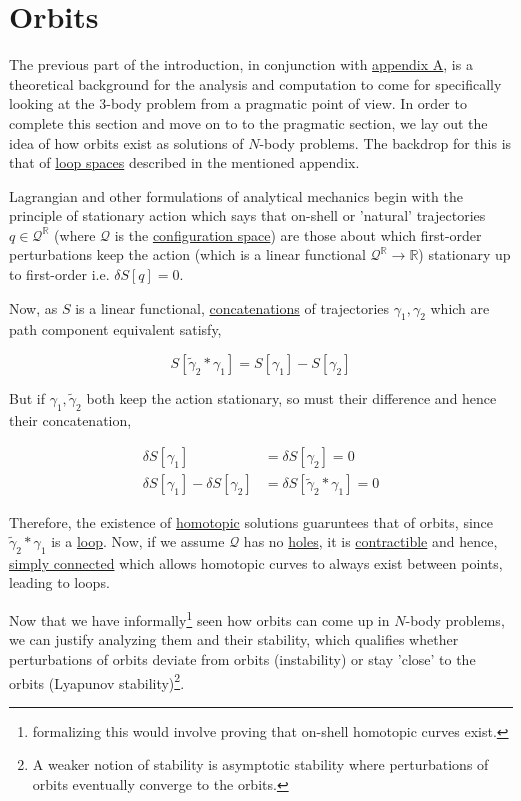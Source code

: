 \documentclass[oneside]{book}
\begin{document}
\newpage
\section{Orbits}

The previous part of the introduction, in conjunction with \hyperref[appendix_A]{appendix A}, is a theoretical background for the analysis and computation to come for specifically looking at the 3-body problem from a pragmatic point of view. In order to complete this section and move on to to the pragmatic section, we lay out the idea of how orbits exist as solutions of $N$-body problems. The backdrop for this is that of \hyperref[loop_spaces]{loop spaces} described in the mentioned appendix.

Lagrangian and other formulations of analytical mechanics begin with the principle of stationary action which says that on-shell or 'natural' trajectories $q \in \mathcal{Q}^{\mathbb{R}}$ (where $\mathcal{Q}$ is the \hyperref[configuration_space]{configuration space}) are those about which first-order perturbations keep the action (which is a linear functional $\mathcal{Q}^{\mathbb{R}} \to \mathbb{R}$) stationary up to first-order i.e. $\delta S[q] = 0$.

Now, as $S$ is a linear functional, \hyperref[concatenation]{concatenations} of trajectories $\gamma_1, \gamma_2$ which are path component equivalent satisfy,

$$S[\tilde{\gamma}_2 * \gamma_1] = S[\gamma_1] - S[\gamma_2]$$

But if $\gamma_1, \tilde{\gamma}_2$ both keep the action stationary, so must their difference and hence their concatenation,

\begin{align*}
\delta S[\gamma_1] & = \delta S[\gamma_2] = 0 \\
\delta S[\gamma_1] - \delta S[\gamma_2] & = \delta S[\tilde{\gamma}_2 * \gamma_1] = 0
\end{align*}

Therefore, the existence of \hyperref[homotopy_equivalence_curves]{homotopic} solutions guaruntees that of orbits, since $\tilde{\gamma}_2 * \gamma_1$ is a \hyperref[loop_defn]{loop}. Now, if we assume $\mathcal{Q}$ has no \hyperref[hole_defn]{holes}, it is \hyperref[contractibility_defn]{contractible} and hence, \hyperref[simple_connectedness_defn]{simply connected} which allows homotopic curves to always exist between points, leading to loops.

Now that we have informally\footnote{formalizing this would involve proving that on-shell homotopic curves exist.} seen how orbits can come up in $N$-body problems, we can justify analyzing them and their stability, which qualifies whether perturbations of orbits deviate from orbits (instability) or stay 'close' to the orbits (Lyapunov stability)\footnote{A weaker notion of stability is asymptotic stability where perturbations of orbits eventually converge to the orbits.}.
\end{document}
